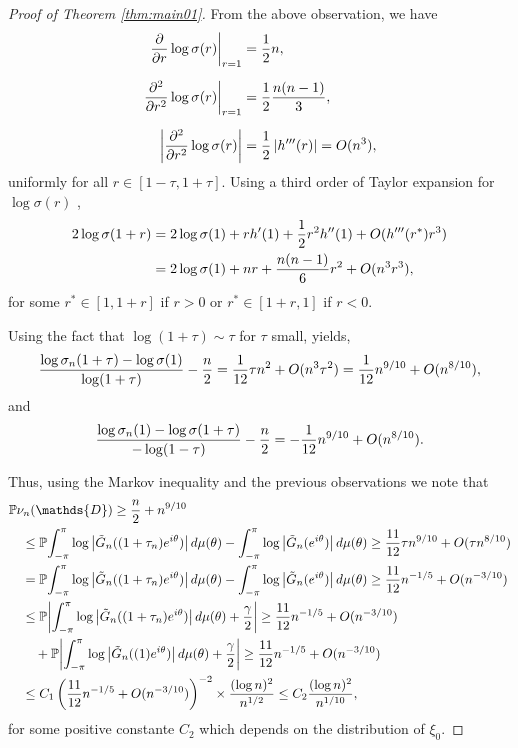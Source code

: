 \documentclass[10pt,a4paper]{amsart}
\newcommand{\PP}[1]{\left(#1\right)}
\renewcommand{\Pr}{\mathbb{P}}
\newcommand{\abs}[1]{\left|#1\right|}
\newcommand{\dd}{\textnormal{d}}
\begin{document}
\begin{proof}[Proof of Theorem \ref{thm:main01}]
From the above observation, we have
\begin{align*}
\left. \frac{\partial}{\partial r} \log\sigma(r) \right|_{r=1} & = \frac{1}{2} n, \\[6pt]
\left. \frac{\partial^2}{\partial r^2} \log\sigma(r) \right|_{r=1} & = \frac{1}{2} \frac{n(n-1)}{3}, \\[6pt]
\abs{ \frac{\partial^2}{\partial r^2} \log\sigma(r) } & =  \frac{1}{2}\abs{h'''(r)} = \textnormal{O}(n^3), 
\end{align*}
uniformly for all $r\in[1-\tau,1+\tau]$.
Using a third order of Taylor expansion for $\log\sigma(r)$ ,
\begin{align*}
2\log\sigma(1+r) & = 2\log\sigma(1) + r h'(1) + \frac{1}{2}r^2 h''(1) + \textnormal{O}(h'''(r^*)r^3) \\
& = 2\log\sigma(1)+ nr +\frac{n(n-1)}{6} r^2 + \textnormal{O}(n^3r^3),
\end{align*}
for some $r^*\in[1,1+r]$ if $r>0$ or $r^*\in[1+r,1]$ if $r<0$.

Using the fact that $\log(1+\tau) \sim \tau$ for $\tau$ small, yields,
\[
\frac{\log\sigma_n(1+\tau)-\log\sigma(1)}{\log(1+\tau)} -\frac{n}{2} = \frac{1}{12}\tau n^2 + \textnormal{O}(n^3\tau^2) = \frac{1}{12}n^{9/10} + \textnormal{O}(n^{8/10}),
\]
and
\[
\frac{\log\sigma_n(1)-\log\sigma(1+\tau)}{-\log(1-\tau)} -\frac{n}{2} = -\frac{1}{12}n^{9/10} + \textnormal{O}(n^{8/10}).
\]

Thus, using the Markov inequality and the previous observations we note that
\begin{align*}
& \Pr{\nu_n(\mathds{D}) \geq \frac{n}{2}+n^{9/10}} \\
& \quad \leq \Pr{{\int_{-\pi}^{\pi} \log \abs{\tilde{G}_n((1+\tau_n)e^{i\theta})} \dd \mu(\theta) - \int_{-\pi}^{\pi} \log \abs{\tilde{G}_n(e^{i\theta}) } \dd \mu(\theta)} \geq \frac{11}{12}\tau n^{9/10} + \textnormal{O}(\tau n^{8/10}) } \\
& \quad = \Pr{{\int_{-\pi}^{\pi} \log \abs{\tilde{G}_n((1+\tau_n)e^{i\theta})} \dd \mu(\theta) - \int_{-\pi}^{\pi} \log \abs{\tilde{G}_n(e^{i\theta}) } \dd \mu(\theta)} \geq \frac{11}{12} n^{-1/5} + \textnormal{O}(n^{-3/10})} \\
& \quad \leq \Pr{\abs{\int_{-\pi}^{\pi} \log \abs{\tilde{G}_n((1+\tau_n)e^{i\theta})} \dd \mu(\theta) + \frac{\gamma}{2}} \geq \frac{11}{12} n^{-1/5} + \textnormal{O}(n^{-3/10}) } \\
& \quad\quad + \Pr{\abs{\int_{-\pi}^{\pi} \log \abs{\tilde{G}_n((1)e^{i\theta})} \dd \mu(\theta) + \frac{\gamma}{2}} \geq \frac{11}{12} n^{-1/5} + \textnormal{O}(n^{-3/10}) } \\
& \quad \leq  C_1 \PP{\frac{11}{12} n^{-1/5} + \textnormal{O}(n^{-3/10})}^{-2} \times \frac{(\log n)^2}{n^{1/2}} \leq C_2 \frac{(\log n)^2}{n^{1/10}},
\end{align*}
for some positive constante $C_2$ which depends on the distribution of $\xi_0$.


\end{proof}
\end{document}
